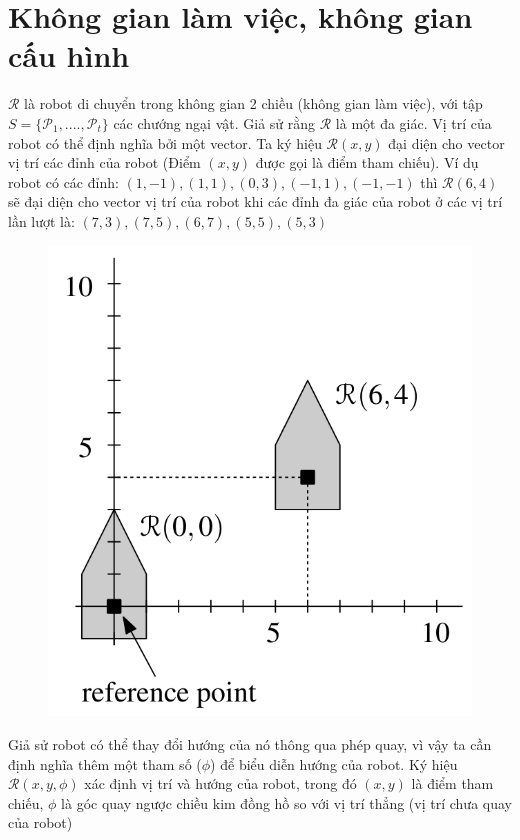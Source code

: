 \documentclass[a4paper,12pt]{report}
\begin{document}
\section{Không gian làm việc, không gian cấu hình}
$\mathcal{R}$ là robot di chuyển trong không gian 2 chiều (không gian làm việc), với tập $S = \{\mathcal{P}_1, ...., \mathcal{P}_t\}$ các chướng ngại vật. Giả sử rằng $\mathcal{R}$ là một đa giác. Vị trí của robot có thể định nghĩa bởi một vector. Ta ký hiệu $\mathcal{R}(x,y)$ đại diện cho vector vị trí các đỉnh của robot (Điểm $(x,y)$ được gọi là điểm tham chiếu). Ví dụ robot có các đỉnh: $(1,-1), (1,1), (0,3), (-1,1), (-1,-1)$ thì $\mathcal{R}(6,4)$ sẽ đại diện cho vector vị trí của robot khi các đỉnh đa giác của robot ở các vị trí lần lượt là: $(7,3), (7,5), (6,7), (5,5), (5,3)$
\begin{figure}[H]
\centering
\includegraphics[scale=0.25]{work_space_definition.png}
\end{figure}
Giả sử robot có thể thay đổi hướng của nó thông qua phép quay, vì vậy ta cần định nghĩa thêm một tham số ($\phi$) để biểu diễn hướng của robot. Ký hiệu $\mathcal{R}(x,y,\phi)$ xác định vị trí và hướng của robot, trong đó $(x,y)$ là điểm tham chiếu, $\phi$ là góc quay ngược chiều kim đồng hồ so với vị trí thẳng (vị trí chưa quay của robot)
\end{document}
